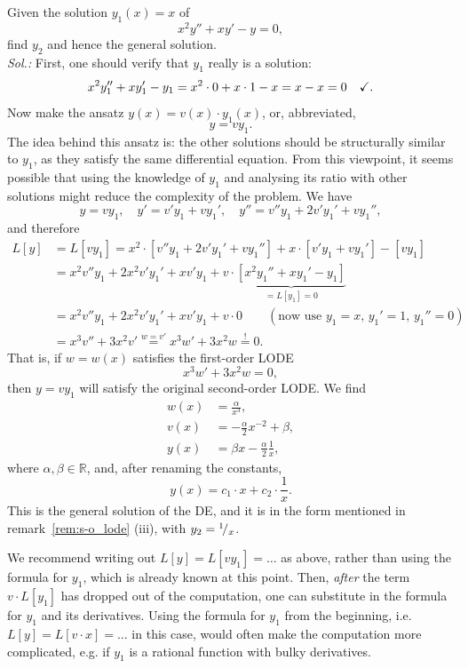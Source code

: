 \begin{example}
Given the solution $y_1(x)=x$ of 
\[ x^2y''+xy'-y=0, \]
find $y_2$ and hence the general solution. \\
{\it Sol.:} First, one should verify that $y_1$ really is a solution:
\[ x^2y_1''+xy_1'-y_1=x^2 \cdot 0 + x \cdot 1 - x = x-x = 0 \quad \text{\checkmark}. \]
Now make the ansatz $y(x)=v(x) \cdot y_1(x)$, or, abbreviated, \[y=vy_1.\] The idea behind this ansatz is: the other solutions should be structurally similar to $y_1$, as they satisfy the same differential equation. From this viewpoint, it seems possible that using the knowledge of $y_1$ and analysing its ratio with other solutions might reduce the complexity of the problem. We have
\[ y=vy_1,\quad y'=v'y_1+vy_1', \quad y''=v''y_1+2v'y_1'+vy_1'', \]
and therefore
\begin{equation*}
\begin{split}
L[y] & = L[vy_1] = x^2 \cdot \left[ v''y_1+2v'y_1'+vy_1'' \right]
+ x \cdot \left[ v'y_1+vy_1' \right] - \left[ vy_1 \right] \\
& = x^2v''y_1+2x^2v'y_1'+xv'y_1+v \cdot
\underbrace{\left[ x^2y_1''+xy_1'-y_1 \right]}_{=L[y_1]=0} \\
& = x^2v''y_1+2x^2v'y_1'+xv'y_1+v \cdot 0 \qquad (\text{now use~} y_1=x,\,y_1'=1,\,y_1''=0) \\
& = x^3v''+3x^2v' \stackrel{w=v'}{=} x^3w'+3x^2w \stackrel{!}{=} 0.
\end{split}
\end{equation*}
That is, if $w=w(x)$ satisfies the first-order LODE
\[ x^3w'+3x^2w = 0, \]
then $y=vy_1$ will satisfy the original second-order LODE. We find
\begin{equation*}
\begin{split}
w(x) &= \frac{\alpha}{x^3}, \\
v(x) &= -\frac{\alpha}{2}x^{-2} + \beta, \\
y(x) &= \beta x - \frac{\alpha}{2} \frac{1}{x},
\end{split}
\end{equation*}
where $\alpha, \beta \in \mathbb{R}$, and, after renaming the constants,
\[ y(x) = c_1 \cdot x + c_2 \cdot \frac{1}{x}. \]
This is the general solution of the DE, and it is in the form mentioned in remark~\ref{rem:s-o_lode} (iii), with $y_2={}^{1}\!/_{x}$.
\end{example}

\begin{remark}
We recommend writing out $L[y]=L[vy_1]=\dots$ as above, rather than using the formula for $y_1$, which is already known at this point. Then, \emph{after} the term $v \cdot L[y_1]$ has dropped out of the computation, one can substitute in the formula for $y_1$ and its derivatives. Using the formula for $y_1$ from the beginning, i.e. $L[y]=L[v \cdot x]=\dots$ in this case, would often make the computation more complicated, e.g. if $y_1$ is a rational function with bulky derivatives. 
\end{remark}

